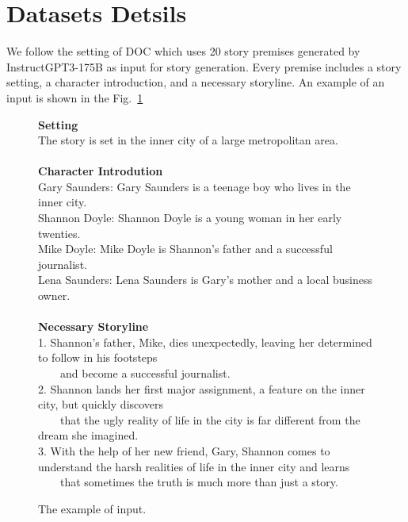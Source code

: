 \appendix




\section{Datasets Detsils}
\label{sup:Datasets Detsils}
We follow the setting of DOC \cite{DOC} which uses 20 story premises generated by InstructGPT3-175B as input for story generation. Every premise includes a story setting, a character introduction, and a necessary storyline. An example of an input is shown in the Fig.~\ref{tab:input premise}


\begin{figure}[htbp]
\centering
\begin{tcolorbox}
        \textbf{Setting}\\
        The story is set in the inner city of a large metropolitan area.\\
        \\
        \textbf{Character Introdution}\\
        Gary Saunders: Gary Saunders is a teenage boy who lives in the inner city.\\
        Shannon Doyle: Shannon Doyle is a young woman in her early twenties.\\
        Mike Doyle: Mike Doyle is Shannon's father and a successful journalist.\\
        Lena Saunders: Lena Saunders is Gary's mother and a local business owner.\\
        \\
        \textbf{Necessary Storyline}\\
        1. Shannon's father, Mike, dies unexpectedly, leaving her determined to follow in his footsteps \\~~~~and become a successful journalist.\\
        2. Shannon lands her first major assignment, a feature on the inner city, but quickly discovers \\~~~~that the ugly reality of life in the city is far different from the dream she imagined.\\
        3. With the help of her new friend, Gary, Shannon comes to understand the harsh realities of life in the inner city and learns \\~~~~that sometimes the truth is much more than just a story.\\
\end{tcolorbox}
\caption{The example of input.}
\label{tab:input premise}
\end{figure}


